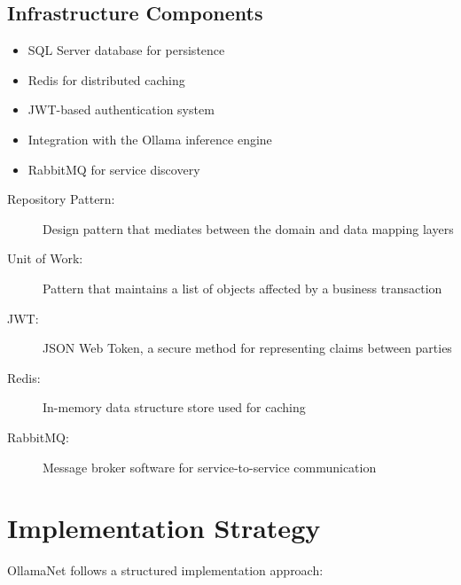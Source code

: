 \subsection{Infrastructure Components}
\begin{itemize}
    \item SQL Server database for persistence
    \item Redis for distributed caching
    \item JWT-based authentication system
    \item Integration with the Ollama inference engine
    \item RabbitMQ for service discovery
\end{itemize}


\begin{terminology}
\begin{description}
    \item[Repository Pattern:] Design pattern that mediates between the domain and data mapping layers
    \item[Unit of Work:] Pattern that maintains a list of objects affected by a business transaction
    \item[JWT:] JSON Web Token, a secure method for representing claims between parties
    \item[Redis:] In-memory data structure store used for caching
    \item[RabbitMQ:] Message broker software for service-to-service communication
\end{description}
\end{terminology}

\section{Implementation Strategy}

OllamaNet follows a structured implementation approach:

